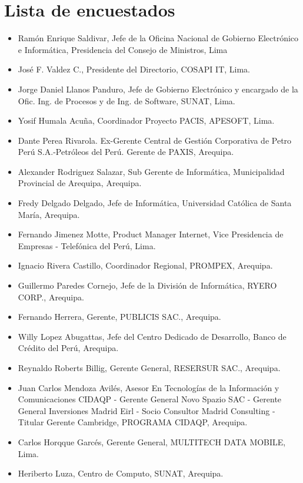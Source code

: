 \section{Lista de encuestados}\label{sec:cs-lista-de-encuestados}

\begin{itemize}
\item Ramón Enrique Saldivar, Jefe de la Oficina Nacional de Gobierno Electrónico e Informática, Presidencia del Consejo de Ministros, Lima
\item José F. Valdez C., Presidente del Directorio, COSAPI IT, Lima.
\item Jorge Daniel Llanos Panduro, Jefe de Gobierno Electrónico y encargado de la Ofic. Ing. de Procesos y de Ing. de Software, SUNAT, Lima.
\item Yosif Humala Acuña, Coordinador Proyecto PACIS, APESOFT, Lima.
\item Dante Perea Rivarola. Ex-Gerente Central de Gestión Corporativa de Petro Perú S.A.-Petróleos del Perú. Gerente de PAXIS, Arequipa.
\item Alexander Rodriguez Salazar, Sub Gerente de Informática, Municipalidad Provincial de Arequipa, Arequipa.
\item Fredy Delgado Delgado, Jefe de Informática, Universidad Católica de Santa Marí­a, Arequipa.
\item Fernando Jimenez Motte, Product Manager Internet, Vice Presidencia de Empresas - Telefónica del Perú, Lima.
\item Ignacio Rivera Castillo, Coordinador Regional, PROMPEX, Arequipa.
\item Guillermo Paredes Cornejo, Jefe de la División de Informática, RYERO CORP., Arequipa.
\item Fernando Herrera, Gerente, PUBLICIS SAC., Arequipa.
\item Willy Lopez Abugattas, Jefe del Centro Dedicado de Desarrollo, Banco de Crédito del Perú, Arequipa.
\item Reynaldo Roberts Billig, Gerente General, RESERSUR SAC., Arequipa.
\item Juan Carlos Mendoza Avilés, Asesor En Tecnologí­as de la Información y Comunicaciones CIDAQP - Gerente General Novo Spazio SAC - Gerente General Inversiones Madrid Eirl - Socio Consultor Madrid Consulting - Titular Gerente Cambridge, PROGRAMA CIDAQP, Arequipa.
\item Carlos Horqque Garcés, Gerente General, MULTITECH DATA MOBILE, Lima.
\item Heriberto Luza, Centro de Computo, SUNAT, Arequipa.

\end{itemize}
